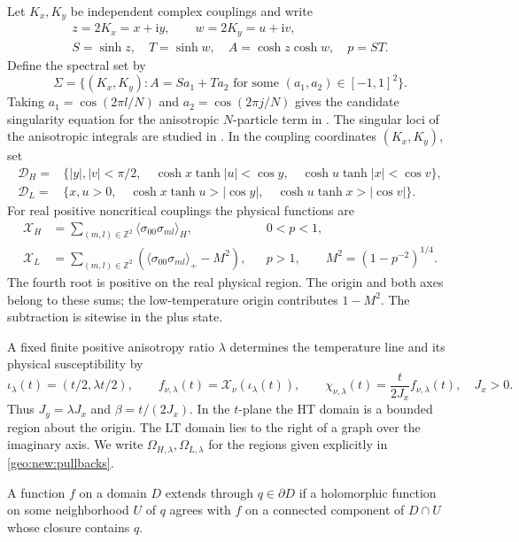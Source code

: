 \documentclass[11pt]{article}
\numberwithin{equation}{section}
\theoremstyle{definition}
\newcommand{\Z}{\mathbb Z}
\newcommand{\ii}{\mathrm i}
\begin{document}
Let $K_x,K_y$ be independent complex couplings and write
\[
 \begin{gathered}
 z=2K_x=x+\ii y,\qquad w=2K_y=u+\ii v,\\
 S=\sinh z,\quad T=\sinh w,\quad A=\cosh z\cosh w,\quad p=ST.
 \end{gathered}
\]
Define the spectral set by
\[
 \Sigma=\{(K_x,K_y):A=S a_1+T a_2\text{ for some }(a_1,a_2)\in[-1,1]^2\}.
\]
Taking $a_1=\cos(2\pi l/N)$ and $a_2=\cos(2\pi j/N)$ gives the candidate
singularity equation for the anisotropic $N$-particle term in
\cite[(3.23)--(3.24)]{ONGP}. The singular loci of the anisotropic integrals are studied in \cite{BHM}.
In the coupling coordinates $(K_x,K_y)$, set
\begin{align}
 \mathcal D_H={}&\{|y|,|v|<\pi/2,\quad
 \cosh x\tanh|u|<\cos y,\quad \cosh u\tanh|x|<\cos v\},
 \label{eq:domainH}\\
 \mathcal D_L={}&\{x,u>0,\quad
 \cosh x\tanh u>|\cos y|,\quad \cosh u\tanh x>|\cos v|\}.
 \label{eq:domainL}
\end{align}
For real positive noncritical couplings the physical functions are
\begin{align}
 \mathcal X_H&=\sum_{(m,l)\in\Z^2}\langle\sigma_{00}\sigma_{ml}\rangle_H,
 &&0<p<1,\label{eq:defH}\\
 \mathcal X_L&=\sum_{(m,l)\in\Z^2}
       (\langle\sigma_{00}\sigma_{ml}\rangle_+-M^2),
 &&p>1,\qquad M^2=(1-p^{-2})^{1/4}.
 \label{eq:defL}
\end{align}
The fourth root is positive on the real physical region. The origin and
both axes belong to these sums; the low-temperature origin contributes
$1-M^2$. The subtraction is sitewise in the plus state.

A fixed finite positive anisotropy ratio $\lambda$ determines the
temperature line and its physical susceptibility by
\[
 \iota_\lambda(t)=(t/2,\lambda t/2),\qquad
 f_{\nu,\lambda}(t)=\mathcal X_\nu(\iota_\lambda(t)),\qquad
 \chi_{\nu,\lambda}(t)=\frac{t}{2J_x}f_{\nu,\lambda}(t),\quad J_x>0.
\]
Thus $J_y=\lambda J_x$ and $\beta=t/(2J_x)$. In the $t$-plane the HT
domain is a bounded region about the origin. The LT domain lies to the
right of a graph over the imaginary axis. We write
$\Omega_{H,\lambda},\Omega_{L,\lambda}$ for the regions given
explicitly in \eqref{geo:new:pullbacks}.

A function $f$ on a domain $D$ extends through $q\in\partial D$ if a
holomorphic function on some neighborhood $U$ of $q$ agrees with $f$
on a connected component of $D\cap U$ whose closure contains $q$.
\end{document}
